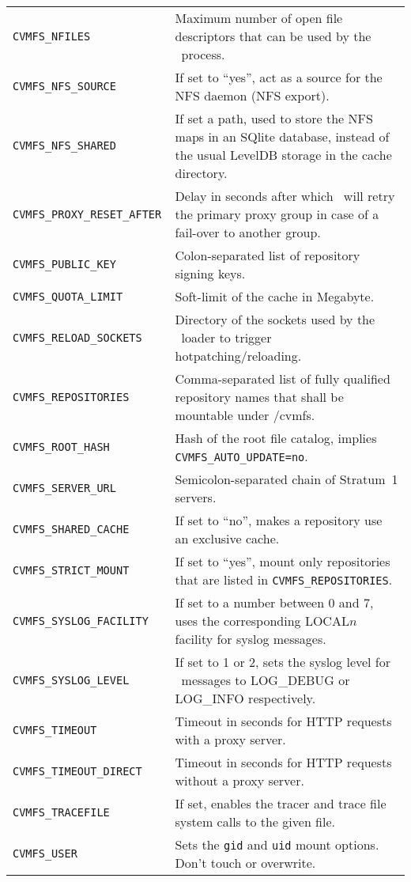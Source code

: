 \begin{longtable}{lX}
		\tt CVMFS\_NFILES					& Maximum number of open file descriptors that can be used by the \cvmfs\ process.\\
		\tt CVMFS\_NFS\_SOURCE				& If set to ``yes'', act as a source for the NFS daemon (NFS export).\\
		\tt CVMFS\_NFS\_SHARED				& If set a path, used to store the NFS maps in an SQlite database, instead of the usual LevelDB storage in the cache directory.\\
		\tt CVMFS\_PROXY\_RESET\_AFTER		& Delay in seconds after which \cvmfs\ will retry the primary proxy group in case of a fail-over to another group.\\
		\tt CVMFS\_PUBLIC\_KEY				& Colon-separated list of repository signing keys.\\
		\tt CVMFS\_QUOTA\_LIMIT			& Soft-limit of the cache in Megabyte.\\
		\tt CVMFS\_RELOAD\_SOCKETS			& Directory of the sockets used by the \cvmfs\ loader to trigger hotpatching/reloading.\\
		\tt CVMFS\_REPOSITORIES			& Comma-separated list of fully qualified repository names that shall be mountable under /cvmfs.\\
		\tt CVMFS\_ROOT\_HASH				& Hash of the root file catalog, implies \texttt{CVMFS\_AUTO\_UPDATE=no}.\\
		\tt CVMFS\_SERVER\_URL				& Semicolon-separated chain of Stratum~1 servers.\\
		\tt CVMFS\_SHARED\_CACHE			& If set to ``no'', makes a repository use an exclusive cache.\\
		\tt CVMFS\_STRICT\_MOUNT			& If set to ``yes'', mount only repositories that are listed in \texttt{CVMFS\_REPOSITORIES}.\\
		\tt CVMFS\_SYSLOG\_FACILITY		& If set to a number between 0 and 7, uses the corresponding LOCAL$n$ facility for syslog messages.\\
		\tt CVMFS\_SYSLOG\_LEVEL			& If set to 1 or 2, sets the syslog level for \cvmfs\ messages to LOG\_DEBUG or LOG\_INFO respectively.\\
		\tt CVMFS\_TIMEOUT 				& Timeout in seconds for HTTP requests with a proxy server.\\
		\tt CVMFS\_TIMEOUT\_DIRECT 		& Timeout in seconds for HTTP requests without a proxy server.\\
		\tt CVMFS\_TRACEFILE				& If set, enables the tracer and trace file system calls to the given file.\\
		\tt CVMFS\_USER						& Sets the \texttt{gid} and \texttt{uid} mount options. Don't touch or overwrite.\\
		\bottomrule
	\end{longtable}
